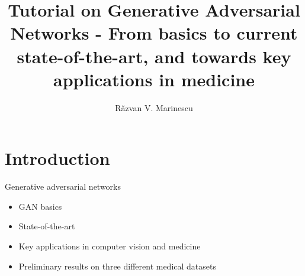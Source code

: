 \documentclass[8pt,xcolor=table,aspectratio=169]{beamer}
\title{Tutorial on Generative Adversarial Networks  - From basics to current state-of-the-art, and towards key applications in medicine}
\author[Raz]{
R\u{a}zvan V. Marinescu\vspace{1em}}
\institute{\small{Medical Vision Group, Massachusetts Institute of Technology}

}
\date{}
\begin{document}
 
\section{Introduction}

\frame{\titlepage}
 











\begin{frame}{Generative adversarial networks}
 
 \begin{itemize}
 
\item GAN basics
  
  \vspace{2em}
  
\item State-of-the-art
  
  \vspace{2em}
    
\item Key applications in computer vision and medicine
  
  \vspace{2em}

\item Preliminary results on three different medical datasets
  
 \end{itemize}

\end{frame}
\end{document}
